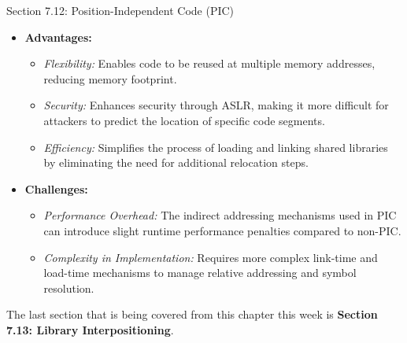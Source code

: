 \begin{notes}{Section 7.12: Position-Independent Code (PIC)}
    \begin{itemize}
        \item \textbf{Advantages:}
            \begin{itemize}
                \item \emph{Flexibility:} Enables code to be reused at multiple memory addresses, reducing memory footprint.
                \item \emph{Security:} Enhances security through ASLR, making it more difficult for attackers to predict the location of specific code segments.
                \item \emph{Efficiency:} Simplifies the process of loading and linking shared libraries by eliminating the need for additional relocation steps.
            \end{itemize}
        \item \textbf{Challenges:}
            \begin{itemize}
                \item \emph{Performance Overhead:} The indirect addressing mechanisms used in PIC can introduce slight runtime performance penalties compared to non-PIC.
                \item \emph{Complexity in Implementation:} Requires more complex link-time and load-time mechanisms to manage relative addressing and symbol resolution.
            \end{itemize}
    \end{itemize}    
\end{notes}

The last section that is being covered from this chapter this week is \textbf{Section 7.13: Library Interpositioning}.

